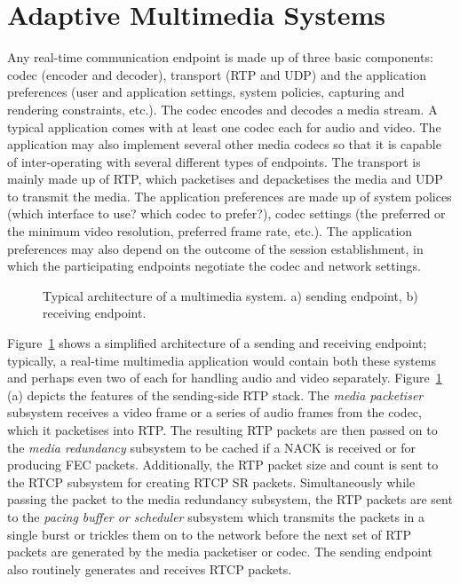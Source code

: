 \section{Adaptive Multimedia Systems}
\label{fw.amusys}

Any real-time communication endpoint is made up of three basic components:
codec (encoder and decoder), transport (RTP and UDP) and the application
preferences (user and application settings, system policies, capturing and
rendering constraints, etc.). The codec encodes and decodes a media stream. A
typical application comes with at least one codec each for audio and video.
The application may also implement several other media codecs so that
it is capable of inter-operating
with several different types of endpoints. The transport is mainly made up of
RTP, which packetises and depacketises the media and UDP to transmit the
media. The application preferences are made up of system polices (which
interface to use? which codec to prefer?), codec settings (the
preferred or the minimum video resolution, preferred frame rate, etc.). The
application preferences may also depend on the outcome of the session
establishment, in which the participating endpoints negotiate the codec and
network settings.

\begin{figure}[!t]
  \centerline{
  }
  \centerline{
  }
  \caption{Typical architecture of a multimedia system. a) sending endpoint,
  b) receiving endpoint.}
  \label{fig:4:appint}
\end{figure}

Figure~\ref{fig:4:appint} shows a simplified architecture of a sending and
receiving endpoint; typically, a real-time multimedia application would
contain both these systems and perhaps even two of each for handling audio and
video separately. Figure~\ref{fig:4:appint} (a) depicts the features of the
sending-side RTP stack. The \emph{media packetiser} subsystem receives a video
frame or a series of audio frames from the codec, which it packetises into
RTP. The resulting RTP packets are then passed on to the \emph{media
redundancy} subsystem to be cached if a NACK is received or for producing FEC
packets. Additionally, the RTP packet size and count is sent to the RTCP
subsystem for creating RTCP SR packets. Simultaneously while passing the
packet to the media redundancy subsystem, the RTP packets are sent to the
\emph{pacing buffer or scheduler} subsystem which transmits the packets in a
single burst or trickles them on to the network before the next set of RTP
packets are generated by the media packetiser or codec. The sending endpoint
also routinely generates and receives RTCP packets.

